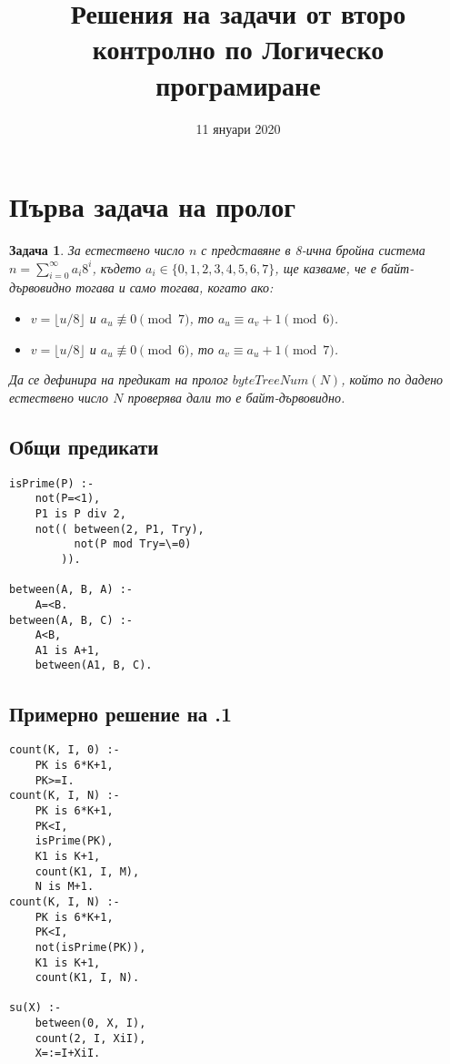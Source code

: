 \documentclass[12pt]{article}
\title{Решения на задачи от второ контролно по Логическо програмиране}
\date{11 януари 2020}
\newtheorem{problem}{Задача}%
\newenvironment{longlisting}{\captionsetup{type=listing}}{}
\begin{document}
\maketitle %
\newpage
\tableofcontents
\newpage %
\section{Първа задача на пролог}
\begin{problem}
    За естествено число $n$ с представяне в 8-ична бройна система $n=\sum_{i=0}^{\infty} a_i 8^i$, където $a_i\in \{0,1,2,3,4,5,6,7\}$, ще казваме, че
    е \emph{байт-дървовидно} тогава и само тогава, когато ако:
    \begin{itemize}
        \item $v=\lfloor{u/8}\rfloor$ и $a_u\not\equiv 0 \pmod 7$, то $a_{u}\equiv a_v+1\pmod 6$.
     \item $v=\lfloor{u/8}\rfloor$ и $a_u\not\equiv 0\pmod 6$, то $a_{v}\equiv a_u+1\pmod 7$.
    \end{itemize}
     
    
    Да се дефинира на предикат на пролог $byteTreeNum(N)$, който по дадено естествено число $N$ проверява дали то е байт-дървовидно.

    \end{problem}
\subsection{Общи предикати}
\begin{longlisting}
\begin{verbatim}
isPrime(P) :-
    not(P=<1),
    P1 is P div 2,
    not(( between(2, P1, Try),
          not(P mod Try=\=0)
        )).

between(A, B, A) :-
    A=<B.
between(A, B, C) :- 
    A<B,
    A1 is A+1,
    between(A1, B, C).
\end{verbatim}
\end{longlisting}

\vskip 0.2in

\subsection{Примерно решение на .1} 
\begin{longlisting}
    \begin{verbatim}
count(K, I, 0) :-
    PK is 6*K+1,
    PK>=I.
count(K, I, N) :-
    PK is 6*K+1,
    PK<I,
    isPrime(PK),
    K1 is K+1,
    count(K1, I, M),
    N is M+1.
count(K, I, N) :-
    PK is 6*K+1,
    PK<I,
    not(isPrime(PK)),
    K1 is K+1,
    count(K1, I, N).

su(X) :-
    between(0, X, I),
    count(2, I, XiI),
    X=:=I+XiI.
\end{verbatim}
\end{longlisting}
\end{document}
